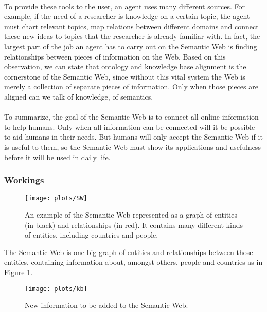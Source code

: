 \documentclass{article}
\begin{document}
 \paragraph{}
 To provide these tools to the user, an agent uses many different sources. For example, if the need of a researcher is knowledge on a certain topic, the agent must chart relevant topics, map relations between different domains and connect these new ideas to topics that the researcher is already familiar with. In fact, the largest part of the job an agent has to carry out on the Semantic Web is finding relationships between pieces of information on the Web. Based on this observation, we can state that ontology and knowledge base alignment is the cornerstone  of the Semantic Web, since without this vital system the Web is merely a collection of separate pieces of information. Only when those pieces are aligned can we talk of knowledge, of semantics.
 \paragraph{}
 To summarize, the goal of the Semantic Web is to connect all online information to help humans. Only when all information can be connected will it be possible to aid humans in their needs. But humans will only accept the Semantic Web if it is useful to them, so the Semantic Web must show its applications and usefulness before it will be used in daily life.
 \subsubsection{Workings}
 \begin{figure}[H]
 \centering
 \texttt{[image: plots/SW]}
 \caption[Semantic Web graph]{An example of the Semantic Web represented as a graph of entities (in black) and relationships (in red). It contains many different kinds of entities, including countries and people.}
 \label{semantic_web}
 \end{figure}
 
 The Semantic Web is one big graph of entities and relationships between those entities, containing information about, amongst others, people and countries as in Figure \ref{semantic_web}.
 
 \begin{figure}[H]
 \centering
 \texttt{[image: plots/kb]}
 \caption[Knowledge base graph]{New information to be added to the Semantic Web.}
 \label{kb}
 \end{figure}
 
\end{document}
